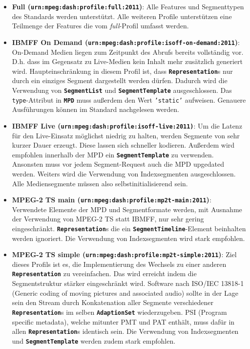 \documentclass[paper = a4, fontsize = 12pt, parskip = half]{scrartcl} %
\def\attr#1{\texttt{#1}}
\def\elem#1{\texttt{\textbf{#1}}}
\begin{document}
\begin{itemize}
	\item \textbf{Full (\attr{urn:mpeg:dash:profile:full:2011})}: Alle Features und Segmenttypen des Standards werden unterstützt. Alle weiteren Profile unterstützen eine Teilmenge der Features die vom \textit{full}-Profil umfasst werden.
	\item \textbf{IBMFF On Demand (\attr{urn:mpeg:dash:profile:isoff-on-demand:2011})}: On-Demand Medien liegen zum Zeitpunkt des Abrufs bereits vollständig vor. D.h. dass im Gegensatz zu Live-Medien kein Inhalt mehr zusätzlich generiert wird. Haupteinschränkung in diesem Profil ist, dass \elem{Representation}s nur durch ein einziges Segment dargestellt werden dürfen. Dadurch wird die Verwendung von \elem{SegmentList} und \elem{SegmentTemplate} ausgeschlossen. Das \attr{type}-Attribut in \elem{MPD} muss außerdem den Wert \attr{'static'} aufweisen. Genauere Ausführungen können im Standard nachgelesen werden.
	\item \textbf{IBMFF Live (\attr{urn:mpeg:dash:profile:isoff-live:2011)}}: Um die Latenz für den Live-Einsatz möglichst niedrig zu halten, werden Segmente von sehr kurzer Dauer erzeugt. Diese lassen sich schneller kodieren. Außerdem wird empfohlen innerhalb der MPD ein \elem{SegmentTemplate} zu verwenden. Ansonsten muss vor jedem Segment-Request auch die MPD upgedated werden. Weiters wird die Verwendung von Indexsegmenten ausgeschlossen. Alle Mediensegmente müssen also selbstinitialisierend sein.
	\item \textbf{MPEG-2 TS main (\attr{urn:mpeg:dash:profile:mp2t-main:2011})}: Verwendete Elemente der MPD und Segmentformate werden, mit Ausnahme der Verwendung von MPEG-2 TS statt IBMFF, nur sehr gering eingeschränkt. \elem{Representation}s die ein \elem{SegmentTimeline}-Element beinhalten werden ignoriert. Die Verwendung von Indexsegmenten wird stark empfohlen.
	\item \textbf{MPEG-2 TS simple (\attr{urn:mpeg:dash:profile:mp2t-simple:2011})}: Ziel dieses Profils ist es, die Implementierung des Wechsels zu einer anderen \elem{Representation} zu vereinfachen. Das wird erreicht indem die Segmentstruktur stärker eingeschränkt wird. Software nach ISO/IEC 13818-1 (Generic coding of moving pictures and associated audio) sollte in der Lage sein den Stream durch Konkatenation aller Segmente verschiedener \elem{Representation}s im selben \elem{AdaptionSet} wiederzugeben. PSI (Program specific metadata), welche mitunter PMT und PAT enthält, muss dafür in allen \elem{Representation}s identisch sein. Die Verwendung von Indexsegmenten und \elem{SegmentTemplate} werden zudem stark empfohlen.
\end{itemize}
 
\end{document}

